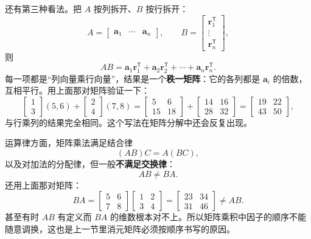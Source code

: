 \documentclass[UTF8,a4paper,12pt]{ctexart}
\numberwithin{equation}{section}
\newcommand{\trans}{^{\mathsf T}}
\begin{document}
	还有第三种看法。把 $A$ 按列拆开、$B$ 按行拆开：
	\begin{equation}\label{eq:4.27}
	A=
	\begin{bmatrix}
		\bm{a}_1&\cdots&\bm{a}_n
	\end{bmatrix},
	\qquad
	B=
	\begin{bmatrix}
		\bm{r}_1\trans\\
		\vdots\\
		\bm{r}_n\trans
	\end{bmatrix},
	\end{equation}
	则
	\begin{equation}\label{eq:4.28}
	AB
	=
	\bm{a}_1\bm{r}_1\trans+
	\bm{a}_2\bm{r}_2\trans+
	\cdots+
	\bm{a}_n\bm{r}_n\trans.
	\end{equation}
	每一项都是“列向量乘行向量”，结果是一个\textbf{秩一矩阵}：它的各列都是 $\bm{a}_i$ 的倍数，互相平行。用上面那对矩阵验证一下：
	\begin{equation}\label{eq:4.29}
	\begin{bmatrix}
		1\\3
	\end{bmatrix}
	(5,6)
	+
	\begin{bmatrix}
		2\\4
	\end{bmatrix}
	(7,8)
	=
	\begin{bmatrix}
		5&6\\
		15&18
	\end{bmatrix}
	+
	\begin{bmatrix}
		14&16\\
		28&32
	\end{bmatrix}
	=
	\begin{bmatrix}
		19&22\\
		43&50
	\end{bmatrix},
	\end{equation}
	与行乘列的结果完全相同。这个写法在矩阵分解中还会反复出现。
	
	运算律方面，矩阵乘法满足结合律
	\begin{equation}\label{eq:4.30}
	(AB)C=A(BC),
	\end{equation}
	以及对加法的分配律，但一般\textbf{不满足交换律}：
	\begin{equation}\label{eq:4.31}
	AB\neq BA.
	\end{equation}
	还用上面那对矩阵：
	\begin{equation}\label{eq:4.32}
	BA=
	\begin{bmatrix}
		5&6\\
		7&8
	\end{bmatrix}
	\begin{bmatrix}
		1&2\\
		3&4
	\end{bmatrix}
	=
	\begin{bmatrix}
		23&34\\
		31&46
	\end{bmatrix}
	\neq AB.
	\end{equation}
	甚至有时 $AB$ 有定义而 $BA$ 的维数根本对不上。所以矩阵乘积中因子的顺序不能随意调换，这也是上一节里消元矩阵必须按顺序书写的原因。
	
\end{document}
